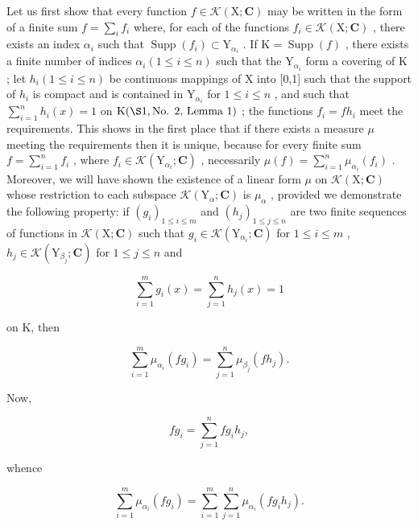 Let us first show that every function \(f \in \mathcal{K}(\mathrm{X};\mathbf{C})\) may be written in the form of a finite sum \(f = \sum_{i} f_{i}\) where, for each of the functions \(f_{i} \in \mathcal{K}(\mathrm{X};\mathbf{C})\) , there exists an index \(\alpha_{i}\) such that \(\operatorname{Supp}(f_{i}) \subset \mathrm{Y}_{\alpha_{i}}\) . If \(\mathrm{K} = \operatorname{Supp}(f)\) , there exists a finite number of indices \(\alpha_{i} (1 \leqslant i \leqslant n)\) such that the \(\mathrm{Y}_{\alpha_{i}}\) form a covering of \(\mathrm{K}\) ; let \(h_{i} (1 \leqslant i \leqslant n)\) be continuous mappings of \(\mathrm{X}\) into {[}0,1{]} such that the support of \(h_{i}\) is compact and is contained in \(\mathrm{Y}_{\alpha_{i}}\) for \(1 \leqslant i \leqslant n\) , and such that \(\sum_{i=1}^{n} h_{i}(x) = 1\) on \(\mathrm{K} (\S 1, \text{No. 2, Lemma 1})\) ; the functions \(f_{i} = f h_{i}\) meet the requirements. This shows in the first place that if there exists a measure \(\mu\) meeting the requirements then it is unique, because for every finite sum \(f = \sum_{i=1}^{n} f_{i}\) , where \(f_{i} \in \mathcal{K}(\mathrm{Y}_{\alpha_{i}}; \mathbf{C})\) , necessarily \(\mu(f) = \sum_{i=1}^{n} \mu_{\alpha_{i}}(f_{i})\) . Moreover, we will have shown the existence of a linear form \(\mu\) on \(\mathcal{K}(\mathrm{X};\mathbf{C})\) whose restriction to each subspace \(\mathcal{K}(\mathrm{Y}_{\alpha};\mathbf{C})\) is \(\mu_{\alpha}\) , provided we demonstrate the following property: if \((g_{i})_{1 \leqslant i \leqslant m}\) and \((h_{j})_{1 \leqslant j \leqslant n}\) are two finite sequences of functions in \(\mathcal{K}(\mathrm{X};\mathbf{C})\) such that \(g_{i} \in \mathcal{K}(\mathrm{Y}_{\alpha_{i}}; \mathbf{C})\) for \(1 \leqslant i \leqslant m\) , \(h_{j} \in \mathcal{K}(\mathrm{Y}_{\beta_{j}}; \mathbf{C})\) for \(1 \leqslant j \leqslant n\) and

\[
\sum_ {i = 1} ^ {m} g _ {i} (x) = \sum_ {j = 1} ^ {n} h _ {j} (x) = 1
\]

on K, then

\[
\sum_ {i = 1} ^ {m} \mu_ {\alpha_ {i}} (f g _ {i}) = \sum_ {j = 1} ^ {n} \mu_ {\beta_ {j}} (f h _ {j}).
\]

Now,

\[
f g _ {i} = \sum_ {j = 1} ^ {n} f g _ {i} h _ {j},
\]

whence

\[
\sum_ {i = 1} ^ {m} \mu_ {\alpha_ {i}} (f g _ {i}) = \sum_ {i = 1} ^ {m} \sum_ {j = 1} ^ {n} \mu_ {\alpha_ {i}} (f g _ {i} h _ {j}).
\]

